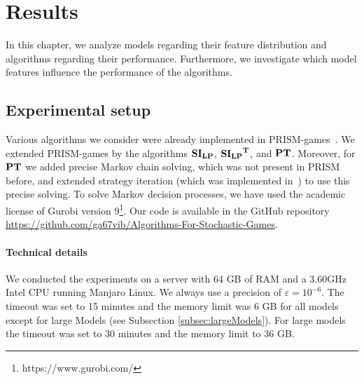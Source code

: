 \chapter{Results} \label{ch:results}

In this chapter, we analyze models regarding their feature distribution and algorithms regarding their performance.
Furthermore, we investigate which model features influence the performance of the algorithms.



\section{Experimental setup}
Various algorithms we consider were already implemented in PRISM-games~\cite{prismgames3}.
We extended PRISM-games by the algorithms $\mathbf{SI_{LP}}$, $\mathbf{\mathbf{SI_{LP}}^T}$, and $\mathbf{PT}$.
Moreover, for $\mathbf{PT}$ we added precise Markov chain solving, which was not present in PRISM before, and extended strategy iteration (which was implemented in~\cite{gandalf}) to use this precise solving.
To solve Markov decision processes, we have used the academic license of Gurobi version 9\footnote{https://www.gurobi.com/}. 
Our code is available in the GitHub repository \url{https://github.com/ga67vib/Algorithms-For-Stochastic-Games}.

\subsubsection*{Technical details}
We conducted the experiments on a server with 64 GB of RAM and a 3.60GHz Intel CPU running Manjaro Linux. %
We always use a precision of $\varepsilon=10^{-6}$. 
The timeout was set to 15 minutes and the memory limit was 6 GB for all models except for large Models (see Subsection \ref{subsec:largeModels}).
For large models the timeout was set to 30 minutes and the memory limit to 36 GB. 

